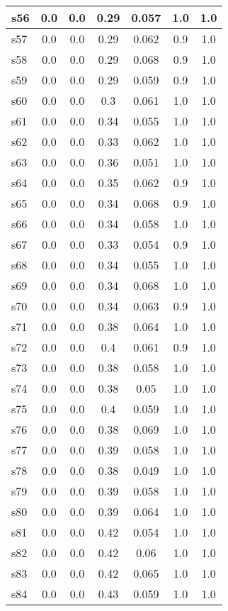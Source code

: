 \documentclass{article}
\begin{document}
\begin{tabular}{|l|c|c|c|c|c|c|}
\hline
s56 &0.0 & 0.0 & 0.29 & 0.057 & 1.0 & 1.0\\
\hline
s57 &0.0 & 0.0 & 0.29 & 0.062 & 0.9 & 1.0\\
\hline
s58 &0.0 & 0.0 & 0.29 & 0.068 & 0.9 & 1.0\\
\hline
s59 &0.0 & 0.0 & 0.29 & 0.059 & 0.9 & 1.0\\
\hline
s60 &0.0 & 0.0 & 0.3 & 0.061 & 1.0 & 1.0\\
\hline
s61 &0.0 & 0.0 & 0.34 & 0.055 & 1.0 & 1.0\\
\hline
s62 &0.0 & 0.0 & 0.33 & 0.062 & 1.0 & 1.0\\
\hline
s63 &0.0 & 0.0 & 0.36 & 0.051 & 1.0 & 1.0\\
\hline
s64 &0.0 & 0.0 & 0.35 & 0.062 & 0.9 & 1.0\\
\hline
s65 &0.0 & 0.0 & 0.34 & 0.068 & 0.9 & 1.0\\
\hline
s66 &0.0 & 0.0 & 0.34 & 0.058 & 1.0 & 1.0\\
\hline
s67 &0.0 & 0.0 & 0.33 & 0.054 & 0.9 & 1.0\\
\hline
s68 &0.0 & 0.0 & 0.34 & 0.055 & 1.0 & 1.0\\
\hline
s69 &0.0 & 0.0 & 0.34 & 0.068 & 1.0 & 1.0\\
\hline
s70 &0.0 & 0.0 & 0.34 & 0.063 & 0.9 & 1.0\\
\hline
s71 &0.0 & 0.0 & 0.38 & 0.064 & 1.0 & 1.0\\
\hline
s72 &0.0 & 0.0 & 0.4 & 0.061 & 0.9 & 1.0\\
\hline
s73 &0.0 & 0.0 & 0.38 & 0.058 & 1.0 & 1.0\\
\hline
s74 &0.0 & 0.0 & 0.38 & 0.05 & 1.0 & 1.0\\
\hline
s75 &0.0 & 0.0 & 0.4 & 0.059 & 1.0 & 1.0\\
\hline
s76 &0.0 & 0.0 & 0.38 & 0.069 & 1.0 & 1.0\\
\hline
s77 &0.0 & 0.0 & 0.39 & 0.058 & 1.0 & 1.0\\
\hline
s78 &0.0 & 0.0 & 0.38 & 0.049 & 1.0 & 1.0\\
\hline
s79 &0.0 & 0.0 & 0.39 & 0.058 & 1.0 & 1.0\\
\hline
s80 &0.0 & 0.0 & 0.39 & 0.064 & 1.0 & 1.0\\
\hline
s81 &0.0 & 0.0 & 0.42 & 0.054 & 1.0 & 1.0\\
\hline
s82 &0.0 & 0.0 & 0.42 & 0.06 & 1.0 & 1.0\\
\hline
s83 &0.0 & 0.0 & 0.42 & 0.065 & 1.0 & 1.0\\
\hline
s84 &0.0 & 0.0 & 0.43 & 0.059 & 1.0 & 1.0\\

\end{tabular}
\end{document}
